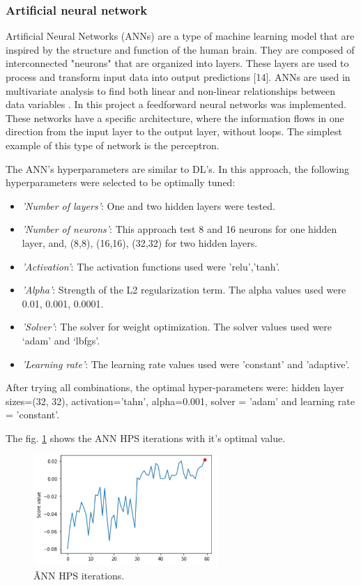 \documentclass[journal]{IEEEtran} %
\begin{document}
\subsubsection{Artificial neural network}
Artificial Neural Networks (ANNs) are a type of machine learning model that are inspired by the structure and function of the human brain. They are composed of interconnected "neurons" that are organized into layers. These layers are used to process and transform input data into output predictions [14]. ANNs are used in multivariate analysis to find both linear and non-linear relationships between data variables \cite{doi:10.4258/hir.2013.19.2.121}. In this project a feedforward neural networks was implemented. These networks have a specific architecture, where the information flows in one direction from the input layer to the output layer, without loops. The simplest example of this type of network is the perceptron.

The ANN's hyperparameters are similar to DL's. In this approach, the following hyperparameters were selected to be optimally tuned:
\begin{itemize}
  \item \textit{'Number of layers'}: One and two hidden layers were tested.
  \item \textit{'Number of neurons'}: This approach test 8 and 16 neurons for one hidden layer, and, (8,8), (16,16), (32,32) for two hidden layers.
  \item \textit{'Activation'}: The activation functions used were 'relu','tanh'.
  \item \textit{'Alpha'}: Strength of the L2 regularization term. The alpha values used were 0.01, 0.001, 0.0001.
  \item \textit{'Solver'}: The solver for weight optimization. The solver values used were ‘adam’ and ‘lbfgs’.
  \item \textit{'Learning rate'}: The learning rate values used were 'constant' and 'adaptive'.
\end{itemize}

After trying all combinations, the optimal hyper-parameters were: hidden layer sizes=(32, 32),  activation='tahn', alpha=0.001, solver = 'adam' and learning rate = 'constant'.

The fig. \ref{fig:ann_h} shows the ANN HPS iterations with it's optimal value.

\begin{figure}[htp]
    \centering
    \includegraphics[width=7cm]{Project2-Report_FAA/figures/nn_hyper.png}
    \caption{ÃNN HPS iterations.}
    \label{fig:ann_h}
\end{figure}
\end{document}
